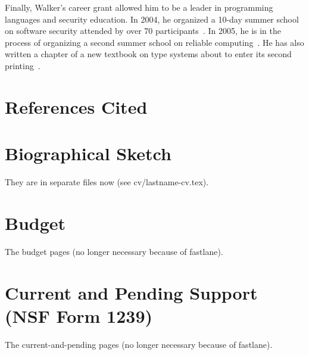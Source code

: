 \documentclass[11pt]{article}
\begin{document}

Finally, Walker's career grant allowed him to be a leader in
programming languages and security education. In 2004, he organized
a 10-day summer school on software security 
attended by over 70 participants~\cite{summerschool04}.  In 2005, he is 
in the process of
organizing a second summer school on reliable computing~\cite{summerschool05}. 
 He has also written a
chapter of a new textbook on type systems about to enter its
second printing~\cite{walker:attapl}.



\newpage
\section{References Cited}
{
 \small
} \newpage
\section{Biographical Sketch}
%

They are in separate files now (see cv/lastname-cv.tex).

\section{Budget}

The budget pages (no longer necessary because of fastlane). 

\section{Current and Pending Support (NSF Form 1239)}

The current-and-pending pages (no longer necessary because of fastlane). 
\end{document}
